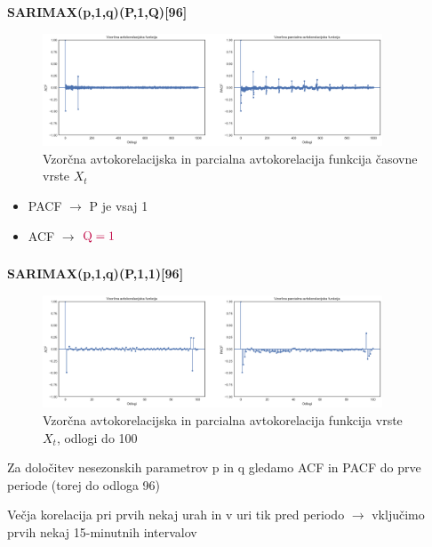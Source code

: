 \documentclass[14p, hyperref={unicode}]{beamer}
\begin{document}
\begin{frame}
    
    \frametitle{} 

    \Large
    \textbf{SARIMAX{\color{orange}(p,1,q)}{\color{purple}(P,1,Q)[96]}}
    \normalsize

    \begin{figure}[h!]
        \centering
        \caption{Vzorčna avtokorelacijska in parcialna avtokorelacija funkcija časovne vrste $X_t$}\par\medskip
        \label{fig:ts_diff_2_acf_pacf}
        \includegraphics[width=0.9\textwidth]{ts_diff_2_acf_pacf.png}
    \end{figure}

    \begin{itemize}
        \item PACF $\rightarrow$ {\color{purple} P je vsaj 1}
        \item ACF $\rightarrow$ $\color{purple} \text{Q} = 1$
    \end{itemize}

\end{frame}




\begin{frame}
    
    \frametitle{} 

    \Large
    \textbf{SARIMAX{\color{orange}(p,1,q)}{\color{purple}(P,1,1)[96]}}
    \normalsize

    \begin{figure}[h!]
        \caption{Vzorčna avtokorelacijska in parcialna avtokorelacija funkcija vrste $X_t$, odlogi do 100}\par\medskip
        \centering
        \label{fig:ts_diff_2_acf_pacf_do_100}
        \includegraphics[width=0.9\textwidth]{ts_diff_2_acf_pacf_do_100.png}
    \end{figure}

    Za določitev {\color{orange}nesezonskih} parametrov {\color{orange}p} in {\color{orange}q} gledamo ACF in PACF do prve periode (torej do odloga 96)

    Večja korelacija pri prvih nekaj urah in v uri tik pred periodo $\rightarrow$
    {\color{orange}vključimo prvih nekaj 15-minutnih intervalov}

\end{frame}
\end{document}
